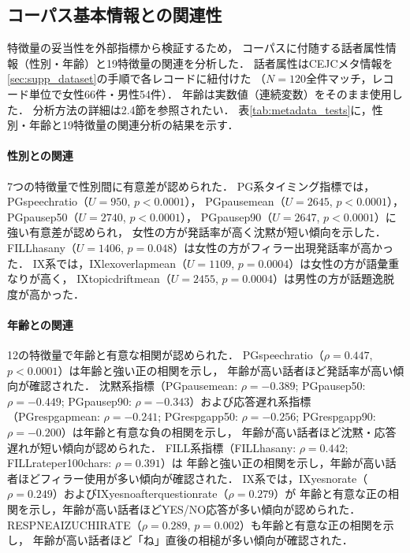 \documentclass[dvipdfmx,11pt,a4paper]{bxjsarticle}
\renewcommand{\_}{\paperorigunderscore\allowbreak}%
\begin{document}
\subsection{コーパス基本情報との関連性}
\label{sec:result_metadata}

特徴量の妥当性を外部指標から検証するため，
コーパスに付随する話者属性情報（性別・年齢）と19特徴量の関連を分析した．
話者属性はCEJCメタ情報を\ref{sec:supp_dataset}の手順で各レコードに紐付けた
（$N = 120$全件マッチ，レコード単位で女性66件・男性54件）．
年齢は実数値（連続変数）をそのまま使用した．
分析方法の詳細は2.4節を参照されたい．
表\ref{tab:metadata_tests}に，性別・年齢と19特徴量の関連分析の結果を示す．

\begin{table}[htbp]
\centering
\caption{19特徴量とコーパス基本情報（性別・年齢）の関連分析．
太字は$p < 0.05$を示す．年齢との関連はSpearman順位相関係数$\rho$で報告する
（Pearson $r$でも同様の有意/非有意パターンが得られた）．
分析方法の詳細は2.4節を参照．}
\label{tab:metadata_tests}

\end{table}

\paragraph{性別との関連}
7つの特徴量で性別間に有意差が認められた．
PG系タイミング指標では，PG\_speech\_ratio（$U = 950$, $p < 0.0001$），
PG\_pause\_mean（$U = 2645$, $p < 0.0001$），
PG\_pause\_p50（$U = 2740$, $p < 0.0001$），
PG\_pause\_p90（$U = 2647$, $p < 0.0001$）に強い有意差が認められ，
女性の方が発話率が高く沈黙が短い傾向を示した．
FILL\_has\_any（$U = 1406$, $p = 0.048$）は女性の方がフィラー出現発話率が高かった．
IX系では，IX\_lex\_overlap\_mean（$U = 1109$, $p = 0.0004$）は女性の方が語彙重なりが高く，
IX\_topic\_drift\_mean（$U = 2455$, $p = 0.0004$）は男性の方が話題逸脱度が高かった．

\paragraph{年齢との関連}
12の特徴量で年齢と有意な相関が認められた．
PG\_speech\_ratio（$\rho = 0.447$, $p < 0.0001$）は年齢と強い正の相関を示し，
年齢が高い話者ほど発話率が高い傾向が確認された．
沈黙系指標（PG\_pause\_mean: $\rho = -0.389$; PG\_pause\_p50: $\rho = -0.449$;
PG\_pause\_p90: $\rho = -0.343$）および応答遅れ系指標
（PG\_resp\_gap\_mean: $\rho = -0.241$; PG\_resp\_gap\_p50: $\rho = -0.256$;
PG\_resp\_gap\_p90: $\rho = -0.200$）は年齢と有意な負の相関を示し，
年齢が高い話者ほど沈黙・応答遅れが短い傾向が認められた．
FILL系指標（FILL\_has\_any: $\rho = 0.442$; FILL\_rate\_per\_100chars: $\rho = 0.391$）は
年齢と強い正の相関を示し，年齢が高い話者ほどフィラー使用が多い傾向が確認された．
IX系では，IX\_yesno\_rate（$\rho = 0.249$）およびIX\_yesno\_after\_question\_rate（$\rho = 0.279$）が
年齢と有意な正の相関を示し，年齢が高い話者ほどYES/NO応答が多い傾向が認められた．
RESP\_NE\_AIZUCHI\_RATE（$\rho = 0.289$, $p = 0.002$）も年齢と有意な正の相関を示し，
年齢が高い話者ほど「ね」直後の相槌が多い傾向が確認された．
\end{document}
